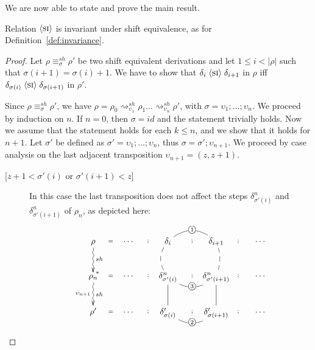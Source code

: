 \documentclass{llncs}
\newcommand{\perm}{\sigma}
\newcommand{\cycl}[1]{\ensuremath{\mbox{\textcircled{\scriptsize{$#1$}}}}}
\newcommand{\shiftdir}[1][]{\ensuremath{\mathrel{{\rightsquigarrow}^{\mathit{sh}}_{#1}}}}
\newcommand{\shifteq}[1][]{\ensuremath{\mathrel{{\equiv}^\mathit{sh}_{#1}}}}
\begin{document}
We are now able to state and prove the main result.

\begin{theorem}[Invariance of $\si$]
Relation $\si$ is invariant under shift equivalence, as for Definition~\ref{def:invariance}.
\end{theorem}

\begin{proof}
Let $\rho \shifteq[\perm] \rho'$ be two shift equivalent derivations and let $1 \leq i <  |\rho|$ such that $\perm(i+1) = \perm(i) + 1$. We have to show that $\delta_i \mathrel{\langle \mbox{\textsc{si}}\rangle} \delta_{i+1}$ in $\rho$  iff  $\delta_{\perm(i)} \si \delta_{\perm(i+1)}$ in $\rho'$.

Since $\rho \shifteq[\perm] \rho'$, we have $\rho = \rho_0 \shiftdir[\upsilon_1] \rho_1 \ldots \shiftdir[\upsilon_n] \rho'$, with $\sigma = \upsilon_1; \ldots; \upsilon_n$. We proceed by induction on $n$. If $n = 0$, then $\perm = id$ and the statement trivially holds. Now we assume that the statement holds for each $k \leq n$, and  we show that it holds for $n+1$. Let  $\sigma'$ be defined as $\sigma' =  \upsilon_1; \ldots; \upsilon_n$, thus  $\sigma = \sigma' ; \upsilon_{n+1}$.  We proceed by case analysis on the last adjacent transposition $\upsilon_{n+1} = (z, z+1)$.

\begin{description} 
\item [{[$z+1 < \sigma'(i)$ or $\sigma'(i+1) < z$]}] In this case the last transposition does not affect the steps $\delta^n_{\sigma'(i)}$ and $\delta^n_{\sigma'(i+1)}$  of $\rho_n$, as depicted here:

$$\xymatrix@C=2pc@R=2pc{
 \rho  \ar@{~>}[d]^{sh}^(.9){*} \ar@{}[r]|{=} &
   \cdots   \ar@{}[r]|{;}  &
    \delta_i \ar@{--}@/_2ex/[d]  \ar@{}[r]|{;} \ar@{-}@/^3ex/[r]|{\cycl{1}} &
    \delta_{i+1} \ar@{--}@/^1ex/[d]  \ar@{}[r]|{;}  & \cdots\\
\rho_n  \ar@{~>}[d]^{sh}_{\upsilon_{n+1}}  \ar@{}[r]|{=} &
   \cdots   \ar@{}[r]|{;}  &
    \delta^n_{\sigma'(i)} \ar@{-}[d]  \ar@{}[r]|{;}  \ar@{-}@/_3ex/[r]|{\cycl{3}}  &
   \delta^n_{\sigma'(i+1)} \ar@{-}[d]  \ar@{}[r]|{;} &
    \cdots\\
\rho'  \ar@{}[r]|{=} & 
    \cdots   \ar@{}[r]|{;}  &
     \delta'_{\sigma(i)} \ar@{}[r]|{;} \ar@{-}@/_3ex/[r]|{\cycl{2}} &
    \delta'_{\sigma(i+1)}  \ar@{}[r]|{;} &
     \cdots  \\
}$$

 

\end{description}
\end{proof}
\end{document}
